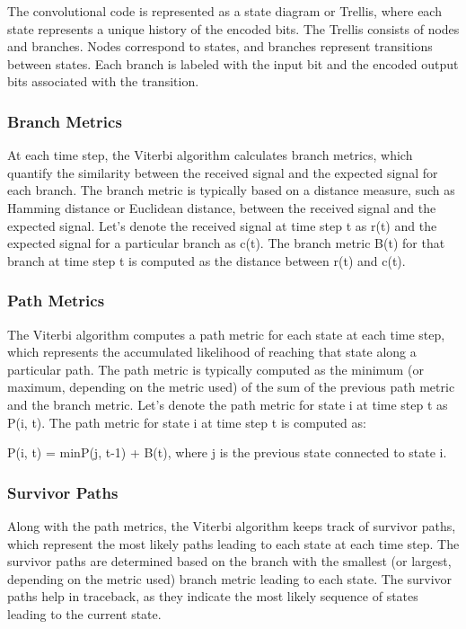 The convolutional code is represented as a state diagram or Trellis, where each state represents a unique history of the encoded bits.
The Trellis consists of nodes and branches. Nodes correspond to states, and branches represent transitions between states.
Each branch is labeled with the input bit and the encoded output bits associated with the transition.

\subsubsection{Branch Metrics}
At each time step, the Viterbi algorithm calculates branch metrics, which quantify the similarity between the received signal and the expected signal for each branch.
The branch metric is typically based on a distance measure, such as Hamming distance or Euclidean distance, between the received signal and the expected signal.
Let's denote the received signal at time step t as r(t) and the expected signal for a particular branch as c(t). The branch metric B(t) for that branch at time step t is computed as the distance between r(t) and c(t).

\subsubsection{Path Metrics}
The Viterbi algorithm computes a path metric for each state at each time step, which represents the accumulated likelihood of reaching that state along a particular path.
The path metric is typically computed as the minimum (or maximum, depending on the metric used) of the sum of the previous path metric and the branch metric.
Let's denote the path metric for state i at time step t as P(i, t). The path metric for state i at time step t is computed as:
\begin{center}
P(i, t) = min{P(j, t-1) + B(t)}, where j is the previous state connected to state i.
\end{center}

\subsubsection{Survivor Paths}
Along with the path metrics, the Viterbi algorithm keeps track of survivor paths, which represent the most likely paths leading to each state at each time step.
The survivor paths are determined based on the branch with the smallest (or largest, depending on the metric used) branch metric leading to each state.
The survivor paths help in traceback, as they indicate the most likely sequence of states leading to the current state.

